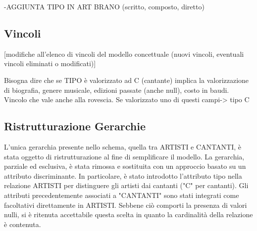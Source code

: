 \documentclass[a4paper,12pt]{article}
\begin{document}
-AGGIUNTA TIPO IN ART BRANO (scritto, composto, diretto)

\subsection{Vincoli}
[modifiche all'elenco di vincoli del modello concettuale (nuovi vincoli, eventuali vincoli eliminati o modificati)]

Bisogna dire che se TIPO è valorizzato ad C (cantante) implica la valorizzazione di biografia, genere musicale, edizioni passate (anche null), costo in baudi. Vincolo che vale anche alla rovescia. Se valorizzato uno di questi campi-> tipo C

\subsection{Ristrutturazione Gerarchie}
L’unica gerarchia presente nello schema, quella tra ARTISTI e CANTANTI, è stata oggetto di ristrutturazione al fine di semplificare il modello. La gerarchia, parziale ed esclusiva, è stata rimossa e sostituita con un approccio basato su un attributo discriminante. In particolare, è stato introdotto l’attributo tipo nella relazione ARTISTI per distinguere gli artisti dai cantanti ("C" per cantanti). Gli attributi precedentemente associati a "CANTANTI" sono stati integrati come facoltativi direttamente in ARTISTI. Sebbene ciò comporti la presenza di valori nulli, si è ritenuta accettabile questa scelta in quanto la cardinalità della relazione è contenuta.
\end{document}
